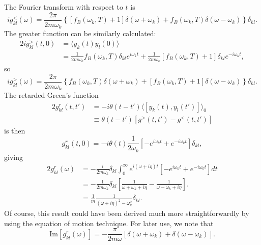 The Fourier transform with respect to $t$ is
\begin{equation}
 ig^<_{kl}(\omega) = \frac{2\pi}{2m\omega_k} \left\{\left[f_B(\omega_k,T)+1 \right] \delta(\omega+\omega_k) + f_B(\omega_k,T) \delta(\omega-\omega_k) \right\}\delta_{kl}.
\end{equation}
The greater function can be similarly calculated:
\begin{alignat}{2}
 ig^>_{kl}(t,0) &= \langle y_k(t)y_l(0) \rangle \\	
  &= \frac{1}{2m\omega_k} f_B(\omega_k,T) \delta_{kl} e^{i\omega_k t} +  \frac{1}{2m\omega_k} [f_B(\omega_k,T)+1] \delta_{kl} e^{-i\omega_k t},
\end{alignat}
so 
\begin{equation}
 ig^>_{kl}(\omega) = \frac{2\pi}{2m\omega_k} \left\{f_B(\omega_k,T)  \delta(\omega+\omega_k) +[ f_B(\omega_k,T) +1 ]\delta(\omega-\omega_k) \right\}\delta_{kl}.
\end{equation}
The retarded Green's function
\begin{alignat}{2}
 g_{kl}^r(t,t') &= -i\theta(t-t') \langle [y_k(t),y_l(t')] \rangle_0 \\ & \equiv \theta(t-t') \left[g^>(t,t')-g^<(t,t') \right]
\end{alignat}
is then
\begin{equation}
 g_{kl}^r(t,0) = -i\theta(t) \frac{1}{2\omega_k} [-e^{i\omega_k t}+e^{-i\omega_k t}] \delta_{kl},
\end{equation}
giving 
\begin{alignat}{2}
 g_{kl}^r(\omega) &= -\frac{i}{2m\omega_k}\delta_{kl}\int_0^{\infty}e^{i(\omega+i\eta)t} [-e^{i\omega_k t}+e^{-i\omega_k t}]  dt \\
  &= -\frac{1}{2m\omega_k}\delta_{kl} \left[ \frac{1}{\omega+\omega_k+i\eta} - \frac{1}{\omega-\omega_k+i\eta} \right]. \\
  &= \frac{1}{m } \frac{1}{(\omega+i\eta)^2-\omega_k^2 } \delta_{kl}.
\end{alignat}
Of course, this result could have been derived much more straightforwardly by using the equation of motion technique. For later use, we note that
\begin{equation}
 \textrm{Im}[g^r_{kl}(\omega)] = - \frac{\pi}{2m\omega}[\delta(\omega+\omega_k) + \delta(\omega-\omega_k)].
\end{equation}


